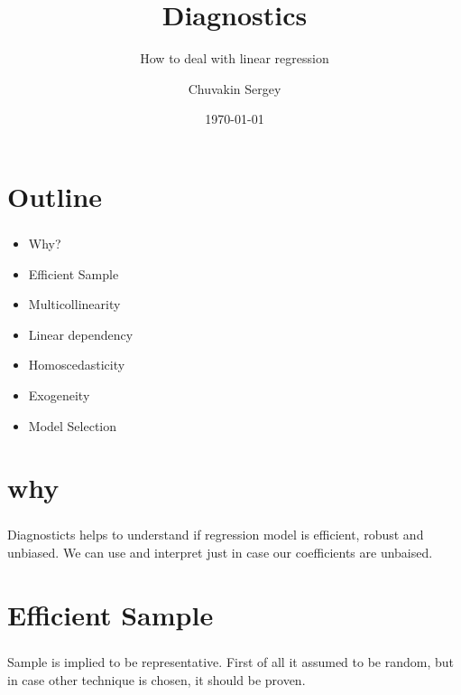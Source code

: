 \documentclass[t, 11pt]{beamer}
\title {Diagnostics}
\subtitle{How to deal with linear regression}
\author{Chuvakin Sergey}
\date{\AdvanceDate[+1]\today}
\institute[<<Anthropology and Sociology major>>]{<<School of Advanced Studies>>}
\begin{document}
	
	
	\frame[plain]{\titlepage}		
	
	\section{Outline}
	
	\begin{frame} 
		\frametitle{\insertsection} 
		\begin{itemize}
			\item Why?
			\item Efficient Sample
			\item Multicollinearity
			\item Linear dependency 
			\item Homoscedasticity
			\item Exogeneity
			\item Model Selection
		\end{itemize}
		
	\end{frame}



\section{why}	
\begin{frame} 
		\frametitle{\insertsection} 
			Diagnosticts helps to understand if regression model is efficient,  robust and unbiased. 
			We can use and interpret just in case our coefficients are unbaised.
		
	\end{frame}
	
\section{Efficient Sample}
\begin{frame} 
	\frametitle{\insertsection} 
		Sample is implied to be representative. First of all it assumed to be random, but in case other technique is chosen, it should be proven. 
	
\end{frame}


\end{document}
